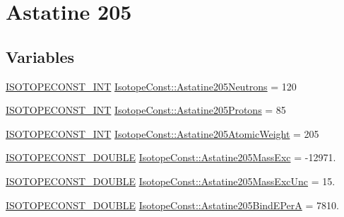 \hypertarget{group___isotope_const-_astatine-_at205}{}\section{Astatine 205}
\label{group___isotope_const-_astatine-_at205}
\subsection*{Variables}
\begin{DoxyCompactItemize}
\item 
\mbox{\hyperlink{group___isotope_const-_macros_ga5f18360b3e99483a35c32d789e62621c}{I\+S\+O\+T\+O\+P\+E\+C\+O\+N\+S\+T\+\_\+\+I\+NT}} \mbox{\hyperlink{group___isotope_const-_astatine-_at205_gaff2e5fe64a544f476330aad6f87ca7a6}{Isotope\+Const\+::\+Astatine205\+Neutrons}} = 120
\item 
\mbox{\hyperlink{group___isotope_const-_macros_ga5f18360b3e99483a35c32d789e62621c}{I\+S\+O\+T\+O\+P\+E\+C\+O\+N\+S\+T\+\_\+\+I\+NT}} \mbox{\hyperlink{group___isotope_const-_astatine-_at205_ga64d549232415c7919c91b1e51fb6ebaa}{Isotope\+Const\+::\+Astatine205\+Protons}} = 85
\item 
\mbox{\hyperlink{group___isotope_const-_macros_ga5f18360b3e99483a35c32d789e62621c}{I\+S\+O\+T\+O\+P\+E\+C\+O\+N\+S\+T\+\_\+\+I\+NT}} \mbox{\hyperlink{group___isotope_const-_astatine-_at205_gab33d3237008fa156902f1f121f609fa8}{Isotope\+Const\+::\+Astatine205\+Atomic\+Weight}} = 205
\item 
\mbox{\hyperlink{group___isotope_const-_macros_ga8f45a7272ce02c0b4c65c44636ed719a}{I\+S\+O\+T\+O\+P\+E\+C\+O\+N\+S\+T\+\_\+\+D\+O\+U\+B\+LE}} \mbox{\hyperlink{group___isotope_const-_astatine-_at205_gaa5e24f3d618fb7c7fc83f04d65ef94aa}{Isotope\+Const\+::\+Astatine205\+Mass\+Exc}} = -\/12971.
\item 
\mbox{\hyperlink{group___isotope_const-_macros_ga8f45a7272ce02c0b4c65c44636ed719a}{I\+S\+O\+T\+O\+P\+E\+C\+O\+N\+S\+T\+\_\+\+D\+O\+U\+B\+LE}} \mbox{\hyperlink{group___isotope_const-_astatine-_at205_gad5c73447074733620c55d17b98753431}{Isotope\+Const\+::\+Astatine205\+Mass\+Exc\+Unc}} = 15.
\item 
\mbox{\hyperlink{group___isotope_const-_macros_ga8f45a7272ce02c0b4c65c44636ed719a}{I\+S\+O\+T\+O\+P\+E\+C\+O\+N\+S\+T\+\_\+\+D\+O\+U\+B\+LE}} \mbox{\hyperlink{group___isotope_const-_astatine-_at205_ga81e8b0374ea34f3901e0ab1afdee5b6d}{Isotope\+Const\+::\+Astatine205\+Bind\+E\+PerA}} = 7810.
\item 

\end{DoxyCompactItemize}
